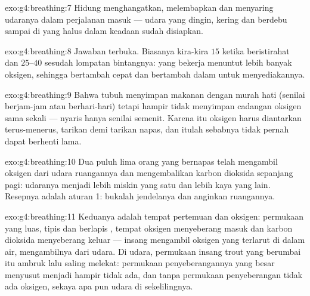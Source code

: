 \begin{solution}{exo:g4:breathing:7}
Hidung menghangatkan, melembapkan dan menyaring udaranya dalam
perjalanan masuk --- udara yang dingin, kering dan berdebu sampai di
 yang halus dalam keadaan sudah disiapkan.
\end{solution}

\begin{solution}{exo:g4:breathing:8}
Jawaban terbuka. Biasanya kira-kira $15$ ketika beristirahat dan
$25$--$40$ sesudah lompatan bintangnya:  yang bekerja menuntut
lebih banyak oksigen, sehingga  bertambah cepat dan
bertambah dalam untuk menyediakannya.
\end{solution}

\begin{solution}{exo:g4:breathing:9}
Bahwa tubuh menyimpan makanan dengan murah hati (senilai berjam-jam
atau berhari-hari) tetapi hampir tidak menyimpan cadangan oksigen sama
sekali --- nyaris hanya senilai semenit. Karena itu oksigen harus
diantarkan terus-menerus, tarikan demi tarikan napas, dan itulah
sebabnya  tidak pernah dapat berhenti lama.
\end{solution}

\begin{solution}{exo:g4:breathing:10}
Dua puluh lima orang yang bernapas telah mengambil oksigen dari udara
ruangannya dan mengembalikan karbon dioksida sepanjang pagi: udaranya
menjadi lebih miskin yang satu dan lebih kaya yang lain. Resepnya
adalah aturan 1: bukalah jendelanya dan anginkan ruangannya.
\end{solution}

\begin{solution}{exo:g4:breathing:11}
Keduanya adalah tempat pertemuan  dan oksigen: permukaan yang
luas, tipis dan berlapis , tempat oksigen menyeberang masuk dan
karbon dioksida menyeberang keluar --- insang mengambil oksigen yang
terlarut di dalam air,  mengambilnya dari udara. Di udara,
permukaan insang  trout yang berumbai itu ambruk lalu saling
melekat: permukaan penyeberangannya yang besar menyusut menjadi hampir
tidak ada, dan tanpa permukaan penyeberangan tidak ada oksigen,
sekaya apa pun udara di sekelilingnya.
\end{solution}
